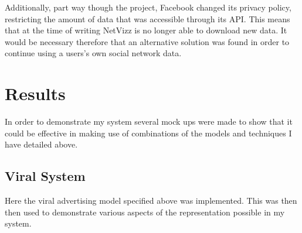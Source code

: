 \documentclass[12pt,a4paper]{article}
\begin{document}
Additionally, part way though the project, Facebook changed its privacy policy, restricting the amount of data that was accessible through its API. This means that at the time of writing NetVizz is no longer able to download new data. It would be necessary therefore that an alternative solution was found in order to continue using a users's own social network data.

\section{Results}
\noindent
In order to demonstrate my system several mock ups were made to show that it could be effective in making use of combinations of the models and techniques I have detailed above.

\subsection{Viral System}
\noindent
Here the viral advertising model specified above was implemented. This was then then used to demonstrate various aspects of the representation possible in my system.
\end{document}
